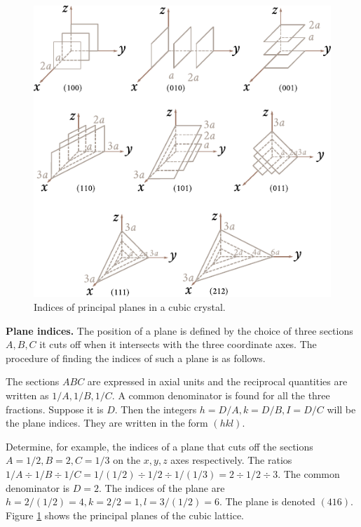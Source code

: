 \begin{figure}[t]
	\begin{center}
		\includegraphics[scale=1.0]{figures/ch_01/fig_1_17.pdf}
		\caption[]{Indices of principal planes in a cubic crystal.}
		\label{fig:1_17}
	\end{center}
	\vspace{-0.7cm}
\end{figure}

\textbf{Plane indices.} The position of a plane is defined by the choice of three sections $A, B, C$ it cuts off when it intersects with the three coordinate axes. The procedure of finding the indices of such a plane is as follows.

The sections $ABC$ are expressed in axial units and the reciprocal quantities are written as $1/A, 1/B, 1/C$. A common denominator is found for all the three fractions. Suppose it is $D$. Then the integers $h=D/A, k=D/B, I=D/C$ will be the plane indices. They are written in the form $(hkl)$.

Determine, for example, the indices of a plane that cuts off the sections $A=1/2, B=2, C=1/3$ on the $x,y,z$ axes respectively. The ratios $1/A \div 1/B \div 1/C = 1/(1/2) \div 1/2 \div 1/(1/3) = 2 \div
1/2 \div 3$. The common denominator is $D=2$. The indices of the plane are $h=2/(1/2)=4, k=2/2=1, l=3/(1/2)=6$. The plane is denoted $(416)$. Figure \ref{fig:1_17} shows the principal planes of the cubic lattice.

